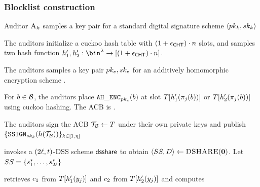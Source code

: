 \subsubsection{Blocklist construction}
%
\begin{algorithm}
\caption{Encrypted Hash Table Based Blocklist}
\label{}
\footnotesize
\begin{algorithmic}[1]


\Procedure{\publishList}{\blocklist}

\State Auditor $\auditor[\auditorIdx]$ samples a key pair for a standard digital signature scheme $\langle \auditorPubKeyGenericScheme[\auditorIdx], \auditorPrivKeyGenericScheme[\auditorIdx] \rangle$


\State The auditors initialize a cuckoo hash table \cuckooTable with $(1 + \epsilon_{\mathsf{CHT}}) \cdot n$ slots, and samples two hash function $\cuckooHashFn{1}, \cuckooHashFn{2}: \bin^{\secParam} \rightarrow \nats[(1 + \cuckooTableParam) \cdot \blocklistSize]$. 

\State The auditors samples a key pair $\encryptPubKey, \encryptPrivKey$ for an additively homomorphic encryption scheme \ahencryptionSchemeDefn. 


\State For $\genericBlocklistElmt \in \blocklist$, the auditors place $\ahencrypt[\encryptPubKey](\genericBlocklistElmt)$ at slot $\cuckooTable[\cuckooHashFn{1}(\projFn[\projIdx](\genericBlocklistElmt))]$ or $\cuckooTable[\cuckooHashFn{2}(\projFn[\projIdx](\genericBlocklistElmt))]$ using cuckoo hashing. The ACB is . 

\State The auditors sign the ACB $\blklistToken \assign \cuckooTable$ under their own private keys and publish $\{\signGenSig[\auditorPrivKeyGenericScheme[\auditorIdx]](\hashFn(\blklistToken))\}_{\auditorIdx \in [1, \numAuditors]}$ 

\EndProcedure


\Statex\Procedure{\thresholdSearchBlocklist}{\genericCInputSet, \chtBlklistToken, \threshold}


\State \client invokes a $(2\ell, t)$-DSS scheme $\mathsf{dsshare}$ to obtain $\langle SS, D \rangle \gets \textsc{DSHARE}(\mathbf{0})$. Let $SS = \{ s_1^{\ast}, \dots, s_{2\ell}^{\ast} \}$


\State \client retrieves $\ciphertext[1]$ from $\cuckooTable[\cuckooHashFn{1}(\genericCInputElmt{\projIdx})]$ and 
$\ciphertext[2]$ from $\cuckooTable[\cuckooHashFn{2}(\genericCInputElmt{\projIdx})]$ and computes


\end{algorithmic}
\end{algorithm}
